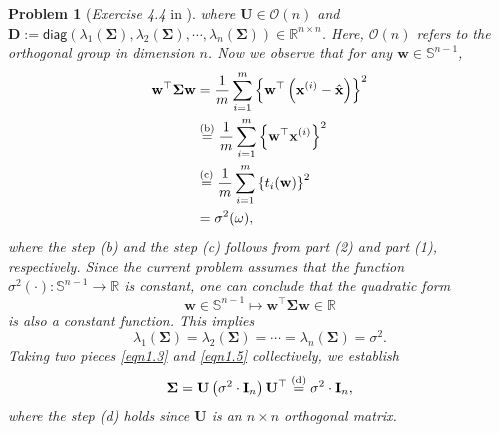 \documentclass[11pt]{article}
\newtheorem{problem}{Problem}
\begin{document}
\begin{problem} [\emph{Exercise 4.4} in \cite{calafiore2014optimization}]
{where $\mathbf{U} \in \mathcal{O}(n)$ and $\mathbf{D} := \textsf{diag} \left( \lambda_1 (\mathbf{\Sigma}), \lambda_2 (\mathbf{\Sigma}), \cdots, \lambda_n (\mathbf{\Sigma}) \right) \in \mathbb{R}^{n \times n}$. Here, $\mathcal{O}(n)$ refers to the orthogonal group in dimension $n$. Now we observe that for any $\mathbf{w} \in \mathbb{S}^{n-1}$,
\begin{equation*}
    \begin{split}
        \mathbf{w}^{\top} \mathbf{\Sigma} \mathbf{w}
        &= \frac{1}{m} \sum_{i=1}^{m} \left\{ \mathbf{w}^{\top} \left( \mathbf{x}^{(i)} - \hat{\mathbf{x}} \right) \right\}^2 \\
        &\stackrel{\textnormal{(b)}}{=} \frac{1}{m} \sum_{i=1}^{m} \left\{ \mathbf{w}^{\top} \mathbf{x}^{(i)} \right\}^2 \\
        &\stackrel{\textnormal{(c)}}{=} \frac{1}{m} \sum_{i=1}^{m} \left\{ t_i (\mathbf{w}) \right\}^2 \\
        &= \sigma^2 (\omega),
    \end{split}
\end{equation*}
where the step (b) and the step (c) follows from part (2) and part (1), respectively. Since the current problem assumes that the function $\sigma^2 (\cdot) : \mathbb{S}^{n-1} \rightarrow \mathbb{R}$ is constant, one can conclude that the quadratic form
\begin{equation*}
    \mathbf{w} \in \mathbb{S}^{n-1} \mapsto \mathbf{w}^{\top} \mathbf{\Sigma} \mathbf{w} \in \mathbb{R}
\end{equation*}
is also a constant function. This implies
\begin{equation}
    \label{eqn1.5}
    \lambda_1 (\mathbf{\Sigma}) = \lambda_2 (\mathbf{\Sigma}) =
    \cdots = \lambda_n (\mathbf{\Sigma}) = \sigma^2.
\end{equation}
Taking two pieces \eqref{eqn1.3} and \eqref{eqn1.5} collectively, we establish
\begin{equation*}
    \mathbf{\Sigma} = \mathbf{U} \left( \sigma^2 \cdot \mathbf{I}_n \right) \mathbf{U}^{\top} 
    \stackrel{\textnormal{(d)}}{=} \sigma^2 \cdot \mathbf{I}_n,
\end{equation*}
where the step (d) holds since $\mathbf{U}$ is an $n \times n$ orthogonal matrix.
}
\end{problem}
\end{document}
